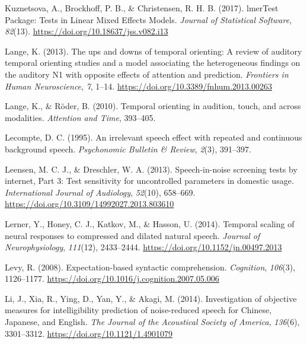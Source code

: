 \documentclass[a4paper, nobind]{templates/ociamthesis}
\newlength{\cslhangindent}
\newenvironment{CSLReferences}[2] %
 {%
  \setlength{\parindent}{0pt}
  \ifodd #1
  \let\oldpar\par
  \def\par{\hangindent=\cslhangindent\oldpar}
  \fi
  \setlength{\parskip}{1mm}
  \setlength{\baselineskip}{6mm}
 }%
 {}
\begin{document}
\begin{CSLReferences}{1}{0}
\leavevmode{}%
Kuznetsova, A., Brockhoff, P. B., \& Christensen, R. H. B. (2017). lmerTest Package: Tests in Linear Mixed Effects Models. \emph{Journal of Statistical Software}, \emph{82}(13). \url{https://doi.org/10.18637/jss.v082.i13}

\leavevmode{}%
Lange, K. (2013). {The ups and downs of temporal orienting: A review of auditory temporal orienting studies and a model associating the heterogeneous findings on the auditory N1 with opposite effects of attention and prediction}. \emph{Frontiers in Human Neuroscience}, \emph{7}, 1--14. \url{https://doi.org/10.3389/fnhum.2013.00263}

\leavevmode{}%
Lange, K., \& Röder, B. (2010). Temporal orienting in audition, touch, and across modalities. \emph{Attention and Time}, 393--405.

\leavevmode{}%
Lecompte, D. C. (1995). An irrelevant speech effect with repeated and continuous background speech. \emph{Psychonomic Bulletin \& Review}, \emph{2}(3), 391--397.

\leavevmode{}%
Leensen, M. C. J., \& Dreschler, W. A. (2013). {Speech-in-noise screening tests by internet, Part 3: Test sensitivity for uncontrolled parameters in domestic usage}. \emph{International Journal of Audiology}, \emph{52}(10), 658--669. \url{https://doi.org/10.3109/14992027.2013.803610}

\leavevmode{}%
Lerner, Y., Honey, C. J., Katkov, M., \& Hasson, U. (2014). {Temporal scaling of neural responses to compressed and dilated natural speech}. \emph{Journal of Neurophysiology}, \emph{111}(12), 2433--2444. \url{https://doi.org/10.1152/jn.00497.2013}

\leavevmode{}%
Levy, R. (2008). Expectation-based syntactic comprehension. \emph{Cognition}, \emph{106}(3), 1126--1177. \url{https://doi.org/10.1016/j.cognition.2007.05.006}

\leavevmode{}%
Li, J., Xia, R., Ying, D., Yan, Y., \& Akagi, M. (2014). {Investigation of objective measures for intelligibility prediction of noise-reduced speech for Chinese, Japanese, and English}. \emph{The Journal of the Acoustical Society of America}, \emph{136}(6), 3301--3312. \url{https://doi.org/10.1121/1.4901079}


\end{CSLReferences}
\end{document}

